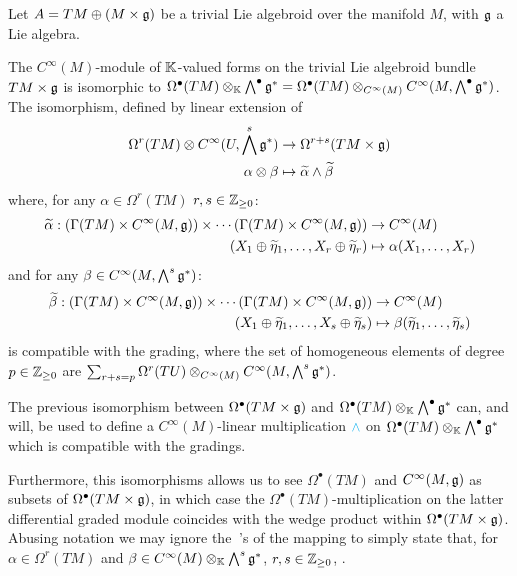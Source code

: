Let $A = TM \oplus (M \times \mathfrak{g})$ be a trivial Lie algebroid over the manifold $M$, with $\mathfrak{g}$ a Lie algebra.

\begin{proposition}\label{propIsoScalarFormsTLA}
The $C^\infty(M)$-module of $\mathbb{K}$-valued forms on the trivial Lie algebroid bundle $TM \times \mathfrak{g}$ is isomorphic to $\Omega^\bullet(TM) \otimes_{\mathbb{K}} \bigwedge^\bullet \mathfrak{g}^* = \Omega^\bullet(TM) \otimes_{C^\infty(M)} C^\infty(M, \bigwedge^\bullet \mathfrak{g}^*)$. The isomorphism, defined by linear extension of
\begin{align*}
    \Omega^r(TM) \otimes C^\infty(U, \bigwedge^s \mathfrak{g}^*) &\to \Omega^{r+s}(TM \times \mathfrak{g})\\
    \alpha \otimes \beta &\mapsto \widetilde \alpha \wedge \widetilde \beta
\end{align*} where, for any $\alpha \in \Omega^r(TM)$ $r, s \in \mathbb{Z}_{\geq 0}$:
\begin{align*}
    \widetilde \alpha: (\Gamma(TM) \times C^\infty(M, \mathfrak{g})) \times \cdots (\Gamma(TM) \times C^\infty(M, \mathfrak{g})) &\to C^\infty(M) \\
    (X_1 \oplus \widetilde \eta_1, \dots, X_r \oplus \widetilde \eta_r) &\mapsto \alpha(X_1, \dots, X_r)
\end{align*} and for any $\beta \in C^\infty(M, \bigwedge^s \mathfrak{g}^*)$:
\begin{align*}
    \widetilde \beta: (\Gamma(TM) \times C^\infty(M, \mathfrak{g})) \times \cdots (\Gamma(TM) \times C^\infty(M, \mathfrak{g})) &\to C^\infty(M) \\
    (X_1 \oplus \widetilde \eta_1, \dots, X_s \oplus \widetilde \eta_s) &\mapsto \beta(\widetilde \eta_1, \dots, \widetilde \eta_s)
\end{align*}
is compatible with the grading, where the set of homogeneous elements of degree $p \in \mathbb{Z}_{\geq 0}$ are $\sum_{r + s = p} \Omega^r(TU) \otimes_{C^\infty(M)} C^\infty(M, \bigwedge^s \mathfrak{g}^*)$.
\end{proposition}

\begin{remark}
The previous isomorphism between $\Omega^\bullet(TM \times \mathfrak{g})$ and $\Omega^\bullet(TM) \otimes_{\mathbb{K}} \bigwedge^\bullet \mathfrak{g}^*$ can, and will, be used to define a $C^\infty(M)$-linear multiplication $\textcolor{cyan}{\wedge}$ on $\Omega^\bullet(TM) \otimes_{\mathbb{K}} \bigwedge^\bullet \mathfrak{g}^*$ which is compatible with the gradings. 

Furthermore, this isomorphisms allows us to see $\Omega^\bullet(TM)$ and $C^\infty(M, \mathfrak{g})$ as subsets of $\Omega^\bullet(TM \times \mathfrak{g})$, in which case the $\Omega^\bullet(TM)$-multiplication on the latter differential graded module coincides with the wedge product within $\Omega^\bullet(TM \times \mathfrak{g})$. Abusing notation we may ignore the $~$'s of the mapping to simply state that, for $\alpha \in \Omega^r(TM)$ and $\beta \in C^\infty(M)\otimes_{\mathbb{K}} \bigwedge^s \mathfrak{g}^*$, $r, s \in \mathbb{Z}_{\geq 0}$, . 
\end{remark}

